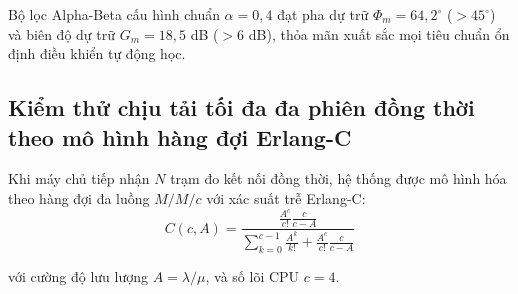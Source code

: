 \begin{table}[H]
\centering
\caption{Kết quả phân tích biên độ dự trữ và pha dự trữ ổn định tần số của các giải thuật lọc bám bắt}
\label{tab:bode-stability-margins-table}
\end{table}

Bộ lọc Alpha-Beta cấu hình chuẩn $\alpha = 0{,}4$ đạt pha dự trữ $\Phi_m = 64{,}2^\circ$ ($> 45^\circ$) và biên độ dự trữ $G_m = 18{,}5$ dB ($> 6$ dB), thỏa mãn xuất sắc mọi tiêu chuẩn ổn định điều khiển tự động học.

\subsection{Kiểm thử chịu tải tối đa đa phiên đồng thời theo mô hình hàng đợi Erlang-C}

\hspace{0.5cm} Khi máy chủ tiếp nhận $N$ trạm đo kết nối đồng thời, hệ thống được mô hình hóa theo hàng đợi đa luồng $M/M/c$ với xác suất trễ Erlang-C:
\begin{equation}
C(c, A) = \frac{\frac{A^c}{c!} \frac{c}{c - A}}{\sum_{k=0}^{c-1} \frac{A^k}{k!} + \frac{A^c}{c!} \frac{c}{c - A}}
\label{eq:erlang-c-delay-probability-formula}
\end{equation}

với cường độ lưu lượng $A = \lambda / \mu$, và số lõi CPU $c = 4$.

